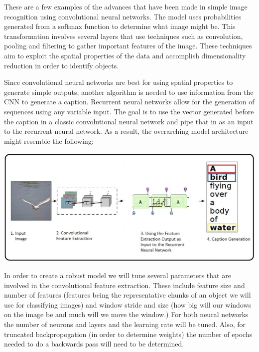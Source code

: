\documentclass[11pt, oneside]{article}   	%
\begin{document}
\vspace{5mm}
These are a few examples of the advances that have been made in simple image recognition using convolutional neural networks. The model uses probabilities generated from a softmax function to determine what image might be. This transformation involves several layers that use techniques such as convolution, pooling and filtering to gather important features of the image. These techniques aim to exploit the spatial properties of the data and accomplish dimensionality reduction in order to identify objects.

Since convolutional neural networks are best for using spatial properties to generate simple outputs, another algorithm is needed to use information from the CNN to generate a caption. Recurrent neural networks allow for the generation of sequences using any variable input. The goal is to use the vector generated before the caption in a classic convolutional neural network and pipe that in as an input to the recurrent neural network. As a result, the overarching model architecture might resemble the following:

\vspace{5mm}
\begin{center}
\includegraphics[scale=0.5]{figures/cnnrnnmodel.jpeg}
\end{center}

In order to create a robust model we will tune several parameters that are involved in the convolutional feature extraction. These include feature size and number of features (features being the representative chunks of an object we will use for classifying images) and window stride and size (how big will our windows on the image be and much will we move the window.) For both neural networks the number of neurons and layers and the learning rate will be tuned. Also, for truncated backpropogation (in order to determine weights) the number of epochs needed to do a backwards pass will need to be determined.
\end{document}
